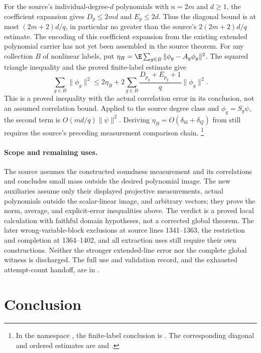 \documentclass[11pt]{article}
\begin{document}
For the source's individual-degree-$d$ polynomials with $n=2m$ and
$d\geq1$, the coefficient expansion gives $D_p\leq2md$ and
$E_p\leq2d$. Thus the diagonal bound is at most $(2m+2)d/q$, in
particular no greater than the source's $2(2m+2)d/q$ estimate.
The encoding of this coefficient expansion from the existing extended
polynomial carrier has not yet been assembled in the source theorem.
For any collection $B$ of nonlinear labels, put
$\eta_B=\E\sum_{g\in B}\|\phi_g-A_g\phi_g\|^2$. The squared
triangle inequality and the proved finite-label estimate give
\[
 \sum_{g\in B}\|\phi_g\|^2
 \leq 2\eta_B+2\sum_{g\in B}
           \frac{D_{p_g}+E_{p_g}+1}{q}\|\phi_g\|^2.
\]
This is a proved inequality with the actual correlation error in its
conclusion, not an assumed correlation bound. Applied to the source
degree class and $\phi_g=S_g\psi$, the second term is
$O(md/q)\|\psi\|^2$. Deriving $\eta_B=O(\delta_{\mathrm{ld}}+\delta_Q)$
from  still requires the source's preceding
measurement comparison chain.%
\footnote{In the namespace
, the finite-label conclusion is
.
The corresponding diagonal and ordered estimates are
 and
.}

\paragraph{Scope and remaining uses.}
The source assumes the constructed soundness measurement and its
correlations and concludes small mass outside the desired polynomial
image. The new auxiliaries assume only their displayed projective
measurements, actual polynomials outside the scalar-linear image, and
arbitrary vectors; they prove the norm, average, and explicit-error
inequalities above. The verdict is a proved local calculation with
faithful domain hypotheses, not a corrected global theorem. The later
wrong-variable-block exclusions at source lines 1341--1363, the
restriction and completion at 1364--1402, and all extraction uses still
require their own constructions. Neither the stronger extended-line
error nor the complete global witness is discharged. The full use and
validation record, and the exhausted attempt-count handoff, are in
.

\section{Conclusion}
\end{document}

